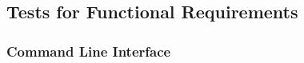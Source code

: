 \documentclass[12pt, titlepage]{article}
\begin{document}
\subsection{Tests for Functional Requirements}











\subsubsection{Command Line Interface}
\end{document}
